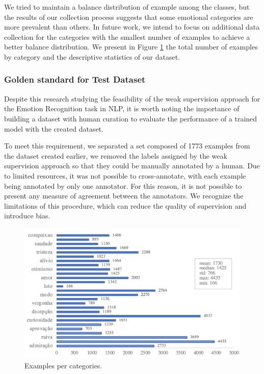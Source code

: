 \documentclass[12pt]{article}
\begin{document}
We tried to maintain a balance distribution of example among the classes, but the results of our collection process suggests that some emotional categories are more prevalent than others. In future work, we intend to focus on additional data collection for the categories with the smallest number of examples to achieve a better balance distribution. We present in Figure \ref{fig:example-per-category} the total number of examples by category and the descriptive statistics of our dataset.

\subsubsection{Golden standard for Test Dataset}
Despite this research studying the feasibility of the weak supervision approach for the Emotion Recognition task in NLP, it is worth noting the importance of building a dataset with human curation to evaluate the performance of a trained model with the created dataset.

To meet this requirement, we separated a set composed of 1773 examples from the dataset created earlier, we removed the labels assigned by the weak supervision approach so that they could be manually annotated by a human. Due to limited resources, it was not possible to cross-annotate, with each example being annotated by only one annotator. For this reason, it is not possible to present any measure of agreement between the annotators. We recognize the limitations of this procedure, which can reduce the quality of supervision and introduce bias.

\begin{figure}
  \label{fig:example-per-category}
  \caption{Examples per categories.}
  \includegraphics[scale=0.5]{img-n-tables/qt-emotion.png}
  \centering
\end{figure}
\end{document}
